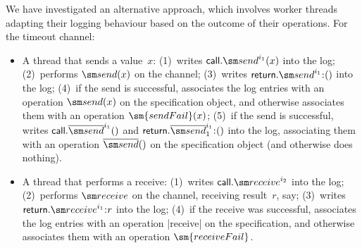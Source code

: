 We have investigated an alternative approach, which involves worker threads
adapting their logging behaviour based on the outcome of their operations.
For the timeout channel:
\begin{itemize}
\item A thread that sends a value~$x$: (1)~writes $\call.\send^{i_1}(x)$ into
  the log; (2)~performs $\send(x)$ on the channel; (3)~writes
  $\return.\send^{i_1} \:: ()$ into the log; (4)~if the send is successful,
  associates the log entries with an operation $\send(x)$ on the specification
  object, and otherwise associates them with an operation $\sm{sendFail}(x)$;
  (5)~if the send is successful, writes $\call.\overline{\send}^{i_1}()$ and
  $\return.\overline{\send}_1^{i_1} \:: ()$ into the log, associating them
  with an operation $\overline{\send}()$ on the specification object (and
  otherwise does nothing).




\item A thread that performs a receive: (1)~writes $\call.\receive^{i_2}$ into
  the log; (2)~performs $\receive$ on the channel, receiving result~$r$, say;
  (3)~writes $\return.\receive^{i_1} \:: r$ into the log; (4)~if the receive
  was successful, associates the log entries with an operation |receive| on
  the specification, and otherwise associates them with an
  operation $\sm{receiveFail}$.
\end{itemize}


